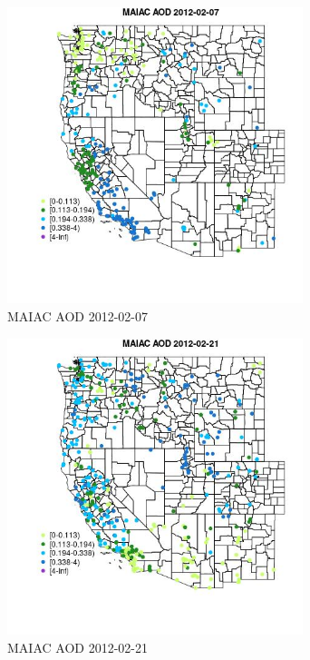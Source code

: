 \begin{figure} 
\centering  
\includegraphics[width=0.77\textwidth]{Code_Outputs/Report_ML_input_PM25_Step4_part_f_de_duplicated_aves_prioritize_24hr_obswNAs_MapObsMAIAC_AOD2012-02-07.jpg} 
\caption{\label{fig:Report_ML_input_PM25_Step4_part_f_de_duplicated_aves_prioritize_24hr_obswNAsMapObsMAIAC_AOD2012-02-07}MAIAC AOD 2012-02-07} 
\end{figure} 
 

\begin{figure} 
\centering  
\includegraphics[width=0.77\textwidth]{Code_Outputs/Report_ML_input_PM25_Step4_part_f_de_duplicated_aves_prioritize_24hr_obswNAs_MapObsMAIAC_AOD2012-02-21.jpg} 
\caption{\label{fig:Report_ML_input_PM25_Step4_part_f_de_duplicated_aves_prioritize_24hr_obswNAsMapObsMAIAC_AOD2012-02-21}MAIAC AOD 2012-02-21} 
\end{figure} 
 


